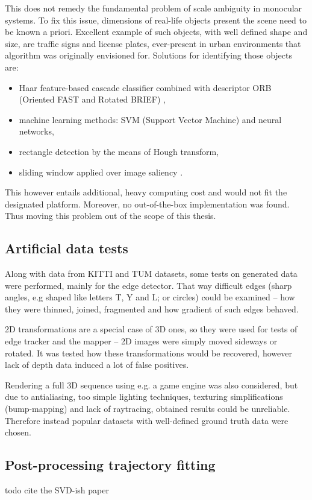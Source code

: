This does not remedy the fundamental problem of scale ambiguity in monocular systems. To fix this issue, dimensions of real-life objects present the scene need to be known a priori. Excellent example of such objects, with well defined shape and size, are traffic signs and license plates, ever-present in urban environments that algorithm was originally envisioned for. Solutions for identifying those objects are:
\begin{itemize}
	\item Haar feature-based cascade classifier combined with descriptor ORB (Oriented FAST and Rotated BRIEF) \cite{opencv},
	\item machine learning methods: SVM (Support Vector Machine) and neural networks,
	\item rectangle detection by the means of Hough transform,
	\item sliding window applied over image saliency \cite{lin2010robust}.
\end{itemize}

This however entails additional, heavy computing cost and would not fit the designated platform. Moreover, no out-of-the-box implementation was found. Thus moving this problem out of the scope of this thesis.

\subsection{Artificial data tests}

Along with data from KITTI and TUM datasets, some tests on generated data were performed, mainly for the edge detector. That way difficult edges (sharp angles, e.g shaped like letters T, Y and L; or circles) could be examined -- how they were thinned, joined, fragmented and how gradient of such edges behaved.

2D transformations are a special case of 3D ones, so they were used for tests of edge tracker and the mapper -- 2D images were simply moved sideways or rotated. It was tested how these transformations would be recovered, however lack of depth data induced a lot of false positives.

Rendering a full 3D sequence using e.g. a game engine was also considered, but due to antialiasing, too simple lighting techniques, texturing simplifications (bump-mapping) and lack of raytracing, obtained results could be unreliable. Therefore instead popular datasets with well-defined ground truth data were chosen.


\subsection{Post-processing trajectory fitting}


todo cite the SVD-ish paper